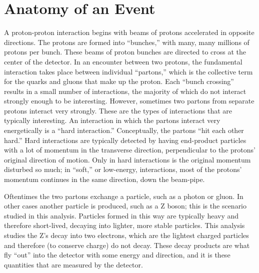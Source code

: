 \section{Anatomy of an Event}


A proton-proton interaction begins 
with beams of protons accelerated 
in opposite directions.  
The protons are formed into ``bunches,'' 
with many, many millions of protons per bunch.  
These beams of proton bunches are directed to 
cross at the center of the detector.  
In an encounter between two protons, 
the fundamental interaction takes place 
between individual ``partons,'' 
which is the collective term for 
the quarks and gluons that make up the proton.  
Each ``bunch crossing'' results in 
a small number of interactions, 
the majority of which do not interact 
strongly enough to be interesting.  
However, sometimes two partons %
from separate protons interact very strongly.  
These are the types of interactions 
that are typically interesting.  
An interaction in which the partons interact 
very energetically is a ``hard interaction.''  
Conceptually, the partons ``hit each other hard.''  
Hard interactions are typically detected 
by having end-product particles with 
a lot of momentum 
in the transverse direction, 
perpendicular to the protons' original 
direction of motion.  
Only in hard interactions is the original 
momentum disturbed so much; 
in ``soft,'' or low-energy, interactions, 
most of the protons' momentum 
continues in the same direction, 
down the beam-pipe.  

Oftentimes the two partons exchange 
a particle, such as a photon or gluon.  
In other cases another particle is produced, %
such as a Z boson; 
this is the scenario 
studied in this analysis.  
Particles formed in this way 
are typically heavy and therefore 
short-lived, 
decaying into lighter, more stable particles.  
This analysis studies the Z's decay into two 
electrons, 
which are the lightest charged particles 
and therefore (to conserve charge) 
do not decay.  
These decay products are what fly ``out'' 
into the detector with 
some energy and direction, 
and it is these quantities 
that are measured by the detector.  

